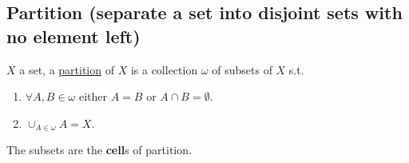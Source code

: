 \documentclass[11pt]{elegantbook}
\begin{document}
\subsection{Partition (separate a set into disjoint sets with no element left)}
\begin{definition}[Partition]
\normalfont
    $X$ a set, a \underline{partition} of $X$ is a collection $\omega$ of subsets of $X$ s.t.
    \begin{enumerate}[1)]
        \item $\forall A,B\in\omega$ either $A=B$ or $A\cap B=\emptyset$.
        \item $\cup_{A\in\omega}A=X$.
    \end{enumerate}
    The subsets are the \textbf{cell}s of partition.
\end{definition}
\end{document}
